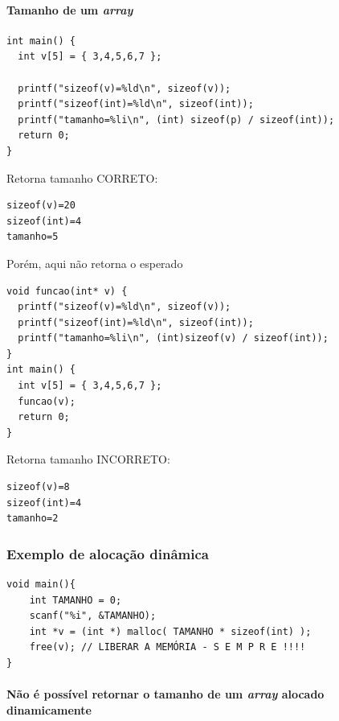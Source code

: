 \documentclass[12pt,a4paper]{article}
\begin{document}
\hypertarget{tamanho-de-um-array}{%
\paragraph{\texorpdfstring{Tamanho de um
\emph{array}}{Tamanho de um array}}\label{tamanho-de-um-array}}

\begin{verbatim}
int main() {
  int v[5] = { 3,4,5,6,7 };

  printf("sizeof(v)=%ld\n", sizeof(v));
  printf("sizeof(int)=%ld\n", sizeof(int));
  printf("tamanho=%li\n", (int) sizeof(p) / sizeof(int));
  return 0;
}
\end{verbatim}

Retorna tamanho CORRETO:

\begin{verbatim}
sizeof(v)=20
sizeof(int)=4
tamanho=5
\end{verbatim}

Porém, aqui não retorna o esperado

\begin{verbatim}
void funcao(int* v) {
  printf("sizeof(v)=%ld\n", sizeof(v));
  printf("sizeof(int)=%ld\n", sizeof(int));
  printf("tamanho=%li\n", (int)sizeof(v) / sizeof(int));
}
int main() {
  int v[5] = { 3,4,5,6,7 };
  funcao(v);
  return 0;
}
\end{verbatim}

Retorna tamanho INCORRETO:

\begin{verbatim}
sizeof(v)=8
sizeof(int)=4
tamanho=2
\end{verbatim}

    \hypertarget{exemplo-de-alocauxe7uxe3o-dinuxe2mica}{%
\subsubsection{Exemplo de alocação
dinâmica}\label{exemplo-de-alocauxe7uxe3o-dinuxe2mica}}

\begin{verbatim}
void main(){
    int TAMANHO = 0;
    scanf("%i", &TAMANHO);
    int *v = (int *) malloc( TAMANHO * sizeof(int) );
    free(v); // LIBERAR A MEMÓRIA - S E M P R E !!!!
}
\end{verbatim}

\hypertarget{nuxe3o-uxe9-possuxedvel-retornar-o-tamanho-de-um-array-alocado-dinamicamente}{%
\paragraph{\texorpdfstring{Não é possível retornar o tamanho de um
\emph{array} alocado
dinamicamente}{Não é possível retornar o tamanho de um array alocado dinamicamente}}\label{nuxe3o-uxe9-possuxedvel-retornar-o-tamanho-de-um-array-alocado-dinamicamente}}
\end{document}
